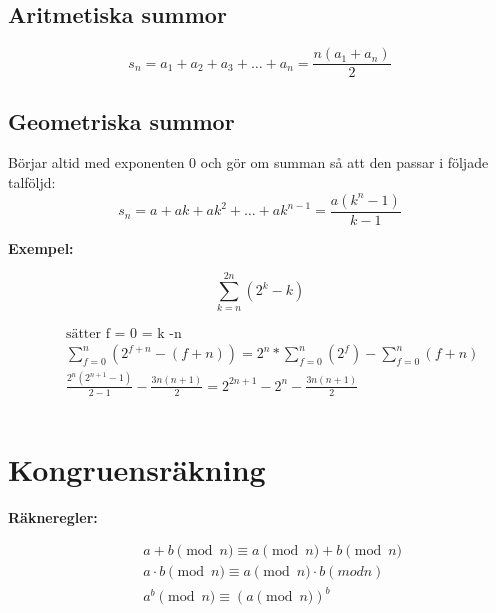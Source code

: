 \documentclass{article}
\begin{document}
\subsection{Aritmetiska summor}
\begin{equation}
s _ { n } = a _ { 1 } + a _ { 2 } + a _ { 3 } + \ldots + a _ { n } = \frac { n \left( a _ { 1 } + a _ { n } \right) } { 2 }
\end{equation}


\subsection{Geometriska summor}
Börjar altid med exponenten 0 och gör om summan så att den passar i följade talföljd:
\begin{equation}
s _ { n } = a + a k + a k ^ { 2 } + \ldots + a k ^ { n - 1 } = \frac { a \left( k ^ { n } - 1 \right) } { k - 1 }
\end{equation}


\textbf{Exempel:}\par
\begin{equation}
\displaystyle\sum _ { k = n } ^ { 2n } (2^{k} - k)
\end{equation}

\begin{align*}
  &\quad \text{sätter f = 0 = k -n} \\
  &\quad \displaystyle\sum _ { f = 0 } ^ { n } (2^{f+n} - (f+n)) = 2^{n} * \displaystyle\sum _ { f = 0 } ^ { n } (2^{f}) - \displaystyle\sum _ { f = 0 } ^ { n } (f+n) \\
  &\quad \frac{2^{n} (2^{n+1} -1)}{2-1} - \frac{3n(n+1)}{2} = 2^{2n+1} - 2^{n} - \frac{3n(n+1)}{2}\\
  &\quad  \\
\end{align*}


\newpage

\section{Kongruensräkning}
\textbf{Räkneregler:}\par
\begin{align*}
  &\quad a+b \pmod{n} \equiv a \pmod{n} + b \pmod{n} \\
  &\quad a \cdot b \pmod{n} \equiv a \pmod{n} \cdot  b(modn) \\
  &\quad a^b \pmod{n} \equiv (a \pmod{n})^b \\
\end{align*}
\end{document}
